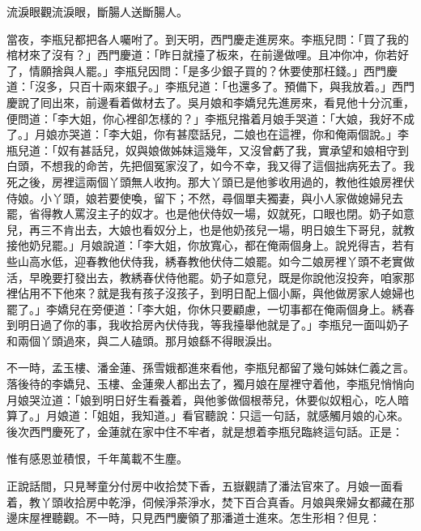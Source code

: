 \begin{myquote}
流淚眼觀流淚眼，斷腸人送斷腸人。
\end{myquote}

當夜，李瓶兒都把各人囑咐了。到天明，西門慶走進房來。李瓶兒問：「買了我的棺材來了沒有？」西門慶道：「昨日就擡了板來，在前邊做哩。且冲你冲，你若好了，情願捨與人罷。」李瓶兒因問：「是多少銀子買的？休要使那枉錢。」西門慶道：「沒多，只百十兩來銀子。」李瓶兒道：「也還多了。預備下，與我放着。」西門慶說了囘出來，前邊看着做材去了。吳月娘和李嬌兒先進房來，看見他十分沉重，便問道：「李大姐，你心裡卻怎樣的？」李瓶兒揝着月娘手哭道：「大娘，我好不成了。」{}月娘亦哭道：「李大姐，你有甚麼話兒，二娘也在這裡，你和俺兩個說。」李瓶兒道：「奴有甚話兒，奴與娘做姊妹這幾年，又沒曾虧了我，實承望和娘相守到白頭，不想我的命苦，先把個冤家沒了，如今不幸，我又得了這個拙病死去了。我死之後，房裡這兩個丫頭無人收拘。那大丫頭已是他爹收用過的，教他徃娘房裡伏侍娘。小丫頭，娘若要使喚，留下；不然，尋個單夫獨妻，與小人家做媳婦兒去罷，省得教人罵沒主子的奴才。也是他伏侍奴一場，奴就死，口眼也閉。奶子如意兒，再三不肯出去，大娘也看奴分上，也是他奶孩兒一場，明日娘生下哥兒，就教接他奶兒罷。」月娘說道：「李大姐，你放寬心，都在俺兩個身上。說兇得吉，若有些山高水低，迎春教他伏侍我，綉春教他伏侍二娘罷。如今二娘房裡丫頭不老實做活，早晚要打發出去，教綉春伏侍他罷。奶子如意兒，既是你說他沒投奔，咱家那裡佔用不下他來？就是我有孩子沒孩子，到明日配上個小厮，與他做房家人媳婦也罷了。」李嬌兒在旁便道：「李大姐，你休只要顧慮，一切事都在俺兩個身上。綉春到明日過了你的事，我收拾房內伏侍我，等我擡舉他就是了。」李瓶兒一面叫奶子和兩個丫頭過來，與二人磕頭。那月娘繇不得眼淚出。

不一時，孟玉樓、潘金蓮、孫雪娥都進來看他，李瓶兒都留了幾句姊妹仁義之言。{}落後待的李嬌兒、玉樓、金蓮衆人都出去了，獨月娘在屋裡守着他，李瓶兒悄悄向月娘哭泣道：「娘到明日好生看養着，與他爹做個根蒂兒，休要似奴粗心，吃人暗算了。」{}月娘道：「姐姐，我知道。」看官聽說：只這一句話，就感觸月娘的心來。後次西門慶死了，金蓮就在家中住不牢者，就是想着李瓶兒臨終這句話。正是：

\begin{myquote}
惟有感恩並積恨，千年萬載不生塵。
\end{myquote}

正說話間，只見琴童分付房中收拾焚下香，五嶽觀請了潘法官來了。月娘一面看着，教丫頭收拾房中乾淨，伺候淨茶淨水，焚下百合真香。月娘與衆婦女都藏在那邊床屋裡聽觀。不一時，只見西門慶領了那潘道士進來。怎生形相？但見：


